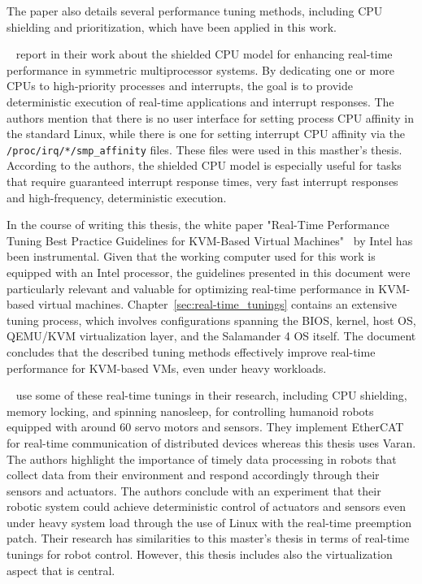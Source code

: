 \documentclass[MMR,Master,english]{twbook}
\begin{document}
\noindent The paper also details several performance tuning methods, including CPU shielding and prioritization, which have been applied in this work.

\clearpage

\bigskip \noindent \citeauthor{broskyShieldedProcessorsGuaranteeing2003}~\cite{broskyShieldedProcessorsGuaranteeing2003} report in their work about the shielded CPU model for enhancing real-time performance in symmetric multiprocessor systems. By dedicating one or more CPUs to high-priority processes and interrupts, the goal is to provide deterministic execution of real-time applications and interrupt responses. The authors mention that there is no user interface for setting process CPU affinity in the standard Linux, while there is one for setting interrupt CPU affinity via the \texttt{/proc/irq/*/smp\_affinity} files. These files were used in this masther's thesis. According to the authors, the shielded CPU model is especially useful for tasks that require guaranteed interrupt response times, very fast interrupt responses and high-frequency, deterministic execution.

\bigskip \noindent In the course of writing this thesis, the white paper "Real-Time Performance Tuning Best Practice Guidelines for KVM-Based Virtual Machines"~\cite{RealTimePerformanceTuning2022} by Intel has been instrumental. Given that the working computer used for this work is equipped with an Intel processor, the guidelines presented in this document were particularly relevant and valuable for optimizing real-time performance in KVM-based virtual machines. Chapter~\ref{sec:real-time_tunings} contains an extensive tuning process, which involves configurations spanning the BIOS, kernel, host OS, QEMU/KVM virtualization layer, and the Salamander 4 OS itself. The document concludes that the described tuning methods effectively improve real-time performance for KVM-based VMs, even under heavy workloads.

\bigskip \noindent \citeauthor{yoonRealTimePerformanceAnalysis2009}~\cite{yoonRealTimePerformanceAnalysis2009} use some of these real-time tunings in their research, including CPU shielding, memory locking, and spinning nanosleep, for controlling humanoid robots equipped with around 60 servo motors and sensors. They implement EtherCAT for real-time communication of distributed devices whereas this thesis uses Varan. The authors highlight the importance of timely data processing in robots that collect data from their environment and respond accordingly through their sensors and actuators. The authors conclude with an experiment that their robotic system could achieve deterministic control of actuators and sensors even under heavy system load through the use of Linux with the real-time preemption patch. Their research has similarities to this master's thesis in terms of real-time tunings for robot control. However, this thesis includes also the virtualization aspect that is central.
\end{document}
